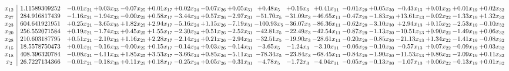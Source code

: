 \documentclass[9pt]{article}
\begin{document}
 \[\begin{array}{c| c c@{\hskip 2pt} c@{\hskip 2pt} c@{\hskip 2pt} c@{\hskip 2pt} c@{\hskip 2pt} c@{\hskip 2pt} c@{\hskip 2pt} c@{\hskip 2pt} c@{\hskip 2pt} c@{\hskip 2pt} c@{\hskip 2pt} c@{\hskip 2pt} c@{\hskip 2pt} c@{\hskip 2pt} c@{\hskip 2pt} c@{\hskip 2pt} }
 x_{12}   &  1.11589309252 & -0.01 x_{21} & +  0.03 x_{33} & -0.07 x_{25} & +  0.01 x_{17} & +  0.02 x_{24} & -0.07 x_{26} & +  0.05 x_{31} & +  0.48 x_{5} & +  0.16 x_{3} & +  0.41 x_{11} & -0.01 x_{29} & +  0.05 x_{30} & -0.43 x_{13} & +  0.01 x_{22} & +  0.01 x_{19} & +  0.02 x_{32}\\
 x_{27}   &  284.916817439 & -1.16 x_{21} & -1.94 x_{33} & -0.00 x_{25} & +  0.58 x_{17} & -3.44 x_{24} & +  0.57 x_{26} & -2.97 x_{31} & -51.70 x_{5} & -31.09 x_{3} & -46.65 x_{11} & -0.47 x_{29} & -1.83 x_{30} & + 13.61 x_{13} & -0.02 x_{22} & -1.33 x_{19} & +  1.32 x_{32}\\
 x_{23}   &  604.641921951 & +  0.25 x_{21} & -3.65 x_{33} & +  1.82 x_{25} & +  2.94 x_{17} & -5.16 x_{24} & +  1.15 x_{26} & -7.19 x_{31} & -100.93 x_{5} & -36.07 x_{3} & -86.36 x_{11} & -0.62 x_{29} & -3.10 x_{30} & +  2.94 x_{13} & +  0.15 x_{22} & -2.53 x_{19} & -0.10 x_{32}\\
 x_{20}   &  256.552071584 & +  0.19 x_{21} & -1.74 x_{33} & +  0.45 x_{25} & +  1.55 x_{17} & -2.30 x_{24} & +  0.51 x_{26} & -2.52 x_{31} & -42.81 x_{5} & -22.49 x_{3} & -42.54 x_{11} & -0.87 x_{29} & -1.13 x_{30} & -10.51 x_{13} & +  0.90 x_{22} & -1.49 x_{19} & +  0.06 x_{32}\\
 x_{28}   &  210.603187795 & +  0.51 x_{21} & -2.10 x_{33} & +  1.16 x_{25} & +  2.28 x_{17} & -2.14 x_{24} & +  0.21 x_{26} & -2.94 x_{31} & -32.51 x_{5} & -19.90 x_{3} & -28.61 x_{11} & -0.20 x_{29} & -0.85 x_{30} & -21.13 x_{13} & +  1.34 x_{22} & -1.41 x_{19} & -0.08 x_{32}\\
 x_{15}   &  18.5578750473 & +  0.01 x_{21} & -0.16 x_{33} & -0.00 x_{25} & +  0.15 x_{17} & -0.14 x_{24} & +  0.03 x_{26} & -0.14 x_{31} & -3.65 x_{5} & -1.24 x_{3} & -3.10 x_{11} & -0.06 x_{29} & -0.10 x_{30} & -0.57 x_{13} & +  0.07 x_{22} & -0.09 x_{19} & +  0.03 x_{32}\\
 x_{18}   &  408.396320784 & -0.08 x_{21} & -4.11 x_{33} & +  1.85 x_{25} & +  3.53 x_{17} & -3.66 x_{24} & +  0.85 x_{26} & -5.11 x_{31} & -78.34 x_{5} & -23.84 x_{3} & -68.45 x_{11} & -0.84 x_{29} & -1.90 x_{30} & -11.53 x_{13} & +  0.86 x_{22} & -2.09 x_{19} & +  0.11 x_{32}\\
 x_{2}   &  26.7227134366 & -0.01 x_{21} & -0.18 x_{33} & +  0.11 x_{25} & +  0.18 x_{17} & -0.25 x_{24} & +  0.05 x_{26} & -0.31 x_{31} & -4.78 x_{5} & -1.72 x_{3} & -4.04 x_{11} & -0.05 x_{29} & -0.13 x_{30} & -1.07 x_{13} & +  0.06 x_{22} & -0.13 x_{19} & +  0.01 x_{32}\\

\end{array}\]
\end{document}
